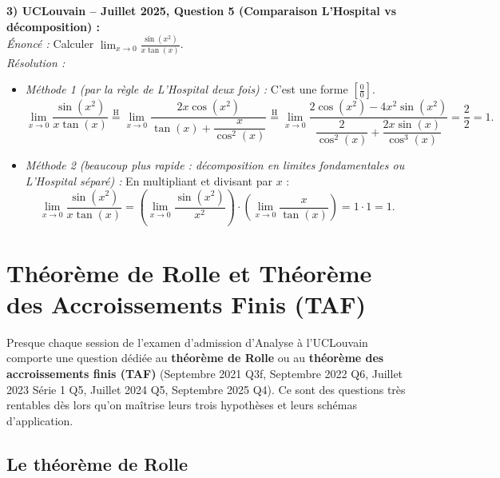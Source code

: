 \begin{exemple}
\medskip
\textbf{3) UCLouvain -- Juillet 2025, Question 5 (Comparaison L'Hospital vs décomposition) :}\\
\emph{Énoncé :} Calculer $\displaystyle \lim_{x \to 0} \frac{\sin(x^2)}{x\tan(x)}$.\\
\emph{Résolution :}
\begin{itemize}
    \item \emph{Méthode 1 (par la règle de L'Hospital deux fois) :} C'est une forme $\left[\frac{0}{0}\right]$.
    \[
        \lim_{x \to 0} \frac{\sin(x^2)}{x\tan(x)} \stackrel{\text{H}}{=} \lim_{x \to 0} \frac{2x\cos(x^2)}{\tan(x) + \dfrac{x}{\cos^2(x)}} \stackrel{\text{H}}{=} \lim_{x \to 0} \frac{2\cos(x^2) - 4x^2\sin(x^2)}{\dfrac{2}{\cos^2(x)} + \dfrac{2x\sin(x)}{\cos^3(x)}} = \frac{2}{2} = \boxed{1}.
    \]
    \item \emph{Méthode 2 (beaucoup plus rapide : décomposition en limites fondamentales ou L'Hospital séparé) :} En multipliant et divisant par $x$ :
    \[
        \lim_{x \to 0} \frac{\sin(x^2)}{x\tan(x)} = \left(\lim_{x \to 0} \frac{\sin(x^2)}{x^2}\right) \cdot \left(\lim_{x \to 0} \frac{x}{\tan(x)}\right) = 1 \cdot 1 = \boxed{1}.
    \]
\end{itemize}
\end{exemple}

\section{Théorème de Rolle et Théorème des Accroissements Finis (TAF)}

Presque chaque session de l'examen d'admission d'Analyse à l'UCLouvain comporte une question dédiée au \textbf{théorème de Rolle} ou au \textbf{théorème des accroissements finis (TAF)} (Septembre 2021 Q3f, Septembre 2022 Q6, Juillet 2023 Série 1 Q5, Juillet 2024 Q5, Septembre 2025 Q4). Ce sont des questions très rentables dès lors qu'on maîtrise leurs trois hypothèses et leurs schémas d'application.

\subsection{Le théorème de Rolle}

